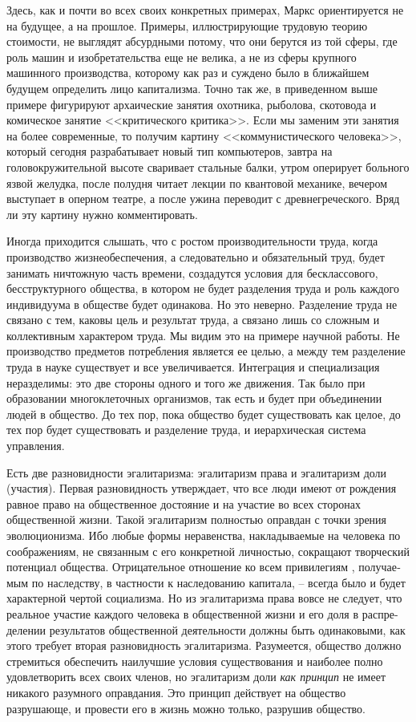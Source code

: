 \documentclass{book}
\begin{document}
Здесь, как и почти во всех своих конкретных примерах, Маркс ориентируется не на будущее, а на прошлое. Примеры, иллюстрирующие трудовую теорию стоимости, не выглядят абсурдными потому, что они берутся из той сферы, где роль машин и изобретательства еще не велика, а не из сферы круп­ного машинного производства, которому как раз и суждено было в ближайшем будущем определить лицо капитализма. Точно так же, в приведенном выше примере фигурируют арха­ические занятия охотника, рыболова, скотовода и комиче­ское занятие <<критического критика>>. Если мы заменим эти занятия на более современные, то получим картину <<коммуни­стического человека>>, который сегодня разрабатывает новый тип компьютеров, завтра на головокружительной высоте сва­ривает стальные балки, утром оперирует больного язвой же­лудка, после полудня читает лекции по квантовой механике, вечером выступает в оперном театре, а после ужина переводит с древнегреческого. Вряд ли эту картину нужно комментиро­вать.

Иногда приходится слышать, что с ростом производитель­ности труда, когда производство жизнеобеспечения, а следо­вательно и обязательный труд, будет занимать ничтожную часть времени, создадутся условия для бесклассового, бесструктур­ного общества, в котором не будет разделения труда и роль каждого индивидуума в обществе будет одинакова. Но это не­верно. Разделение труда не связано с тем, каковы цель и ре­зультат труда, а связано лишь со сложным и коллективным характером труда. Мы видим это на примере научной работы. Не производство предметов потребления является ее целью, а между тем разделение труда в науке существует и все увели­чивается. Интеграция и специализация неразделимы: это две стороны одного и того же движения. Так было при образова­нии многоклеточных организмов, так есть и будет при объе­динении людей в общество. До тех пор, пока общество будет существовать как целое, до тех пор будет существовать и раз­деление труда, и иерархическая система управления.

Есть две разновидности эгалитаризма: эгалитаризм права и эгалитаризм доли (участия). Первая разновидность утверж­дает, что все люди имеют от рождения равное право на общест­венное достояние и на участие во всех сторонах общественной жизни. Такой эгалитаризм полностью оправдан с точки зрения эволюционизма. Ибо любые формы неравенства, накладывае­мые на человека по соображениям, не связанным с его кон­кретной личностью, сокращают творческий потенциал общест­ва. Отрицательное отношение ко всем привилегиям , получае­мым по наследству, в частности к наследованию капитала, -- всегда было и будет характерной чертой социализма. Но из эгалитаризма права вовсе не следует, что реальное участие каждого человека в общественной жизни и его доля в распре­делении результатов общественной деятельности должны быть одинаковыми, как этого требует вторая разновидность эгали­таризма. Разумеется, общество должно стремиться обеспечить наилучшие условия существования и наиболее полно удов­летворить всех своих членов, но эгалитаризм 
доли \textit{как принцип} не имеет никакого разумного оправдания. Это принцип дейст­вует на общество разрушающе, и провести его в жизнь можно только, разрушив общество.
\end{document}

